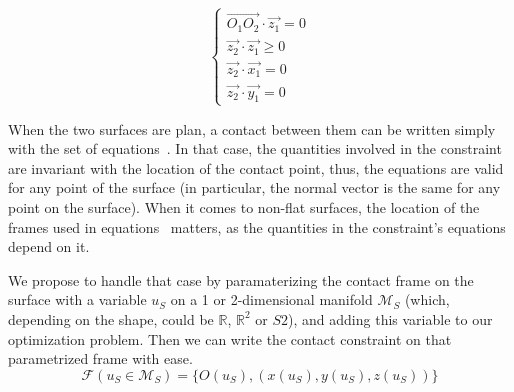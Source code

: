 \begin{equation}
  \left\{
  \begin{array}{ll}
    \overrightarrow{O_1O_2}\cdot\vec{z_1} = 0\\
    \vec{z_2}\cdot\vec{z_1} \geq 0 \\
    \vec{z_2}\cdot\vec{x_1} = 0 \\
    \vec{z_2}\cdot\vec{y_1} = 0
  \end{array}
  \right.
\label{eq:planar_contact}
\end{equation}

When the two surfaces are plan, a contact between them can be written simply with the set of equations~.
In that case, the quantities involved in the constraint are invariant with the location of the contact point, thus, the equations are valid for any point of the surface (in particular, the normal vector is the same for any point on the surface).
When it comes to non-flat surfaces, the location of the frames used in equations~ matters, as the quantities in the constraint's equations depend on it.



We propose to handle that case by paramaterizing the contact frame on the surface with a variable $u_S$ on a 1 or 2-dimensional manifold $\mathcal{M}_S$ (which, depending on the shape, could be $\mathbb{R}$, $\mathbb{R}^2$ or $S2$), and adding this variable to our optimization problem.
Then we can write the contact constraint on that parametrized frame with ease.
\begin{equation}
\label{eq:param_frame}
  \mathcal{F}(u_S\in \mathcal{M}_S) = \{O(u_S), (x(u_S), y(u_S), z(u_S))\}
\end{equation}

